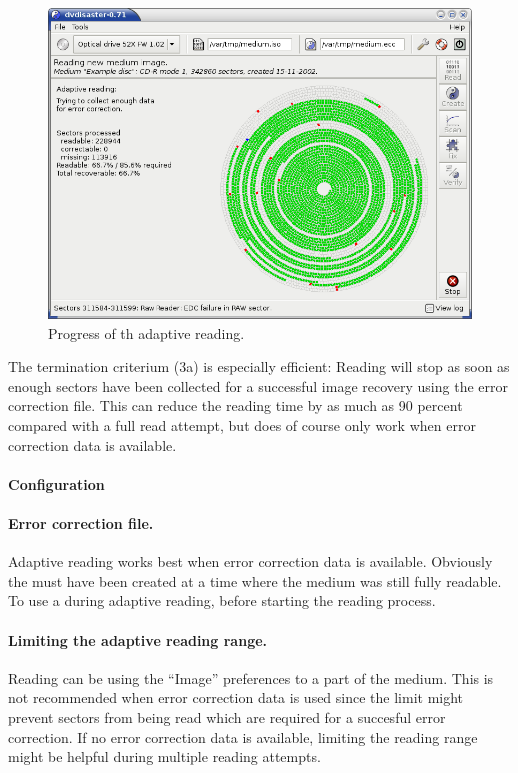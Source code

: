\begin{figure}
\centerline{\includegraphics[width=1.0\textwidth]{screenshots/adaptive-progress.png}}
\caption{Progress of th adaptive reading.}  
\label{background-adaptive-progress}
\end{figure}

The termination criterium (3a) is especially efficient: Reading
will stop as soon as enough sectors have been collected for a
successful image recovery using the error correction file. This
can reduce the reading time by as much as 90 percent compared
with a full read attempt, but does of course only work when
error correction data is available.

\paragraph{Configuration}\quad

\medskip

\paragraph{Error correction file.} Adaptive reading works best when error
correction data is available. Obviously the  must have
been created at a time where the medium was
still fully readable. To use a  during 
adaptive reading,
 before starting the reading process.

\paragraph{Limiting the adaptive reading range.} Reading can
be  using the ``Image'' preferences
to a part of the medium. This is not recommended
when error correction data is used since the limit might prevent sectors
from being read which are required for a succesful error correction. If
no error correction data is available, limiting the reading range might
be helpful during multiple reading attempts.

